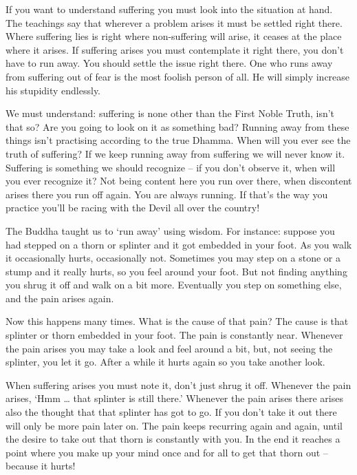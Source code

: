 If you want to understand suffering you must look into the situation at hand. The teachings say that wherever a problem arises it must be settled right there. Where suffering lies is right where non-suffering will arise, it ceases at the place where it arises. If suffering arises you must contemplate it right there, you don't have to run away. You should settle the issue right there. One who runs away from suffering out of fear is the most foolish person of all. He will simply increase his stupidity endlessly.

We must understand: suffering is none other than the First Noble Truth, isn't that so? Are you going to look on it as something bad?  Running away from these things isn't practising according to the true Dhamma. When will you ever see the truth of suffering? If we keep running away from suffering we will never know it. Suffering is something we should recognize -- if you don't observe it, when will you ever recognize it? Not being content here you run over there, when discontent arises there you run off again. You are always running. If that's the way you practice you'll be racing with the Devil all over the country!

The Buddha taught us to `run away' using wisdom. For instance: suppose you had stepped on a thorn or splinter and it got embedded in your foot. As you walk it occasionally hurts, occasionally not. Sometimes you may step on a stone or a stump and it really hurts, so you feel around your foot. But not finding anything you shrug it off and walk on a bit more. Eventually you step on something else, and the pain arises again.

Now this happens many times. What is the cause of that pain? The cause is that splinter or thorn embedded in your foot. The pain is constantly near. Whenever the pain arises you may take a look and feel around a bit, but, not seeing the splinter, you let it go. After a while it hurts again so you take another look.

When suffering arises you must note it, don't just shrug it off. Whenever the pain arises, `Hmm \ldots{} that splinter is still there.' Whenever the pain arises there arises also the thought that that splinter has got to go. If you don't take it out there will only be more pain later on. The pain keeps recurring again and again, until the desire to take out that thorn is constantly with you. In the end it reaches a point where you make up your mind once and for all to get that thorn out -- because it hurts!

